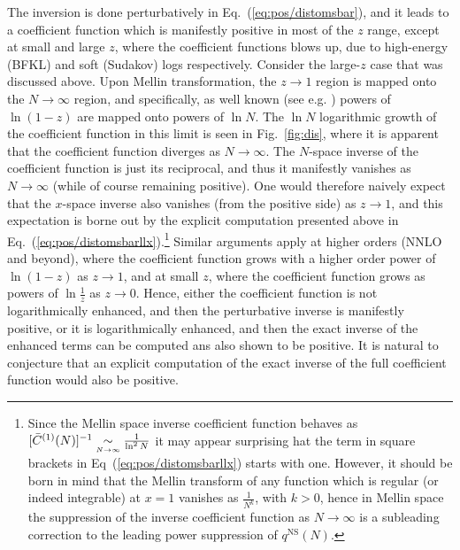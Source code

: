 The
inversion is done perturbatively in Eq.~(\ref{eq:pos/distomsbar}), and it
leads to a coefficient function which is manifestly positive in most
of the $z$ range, except at small and large $z$, where the coefficient
functions blows up, due to high-energy (BFKL) and soft (Sudakov) logs
respectively. Consider the large-$z$ case that was discussed
above. Upon 
Mellin transformation, the $z\to 1$ region is mapped onto the
$N\to\infty$ region, and specifically, as well known (see
e.g. \cite{Forte:2002ni}) powers of $\ln(1-z)$ are mapped onto
powers of $\ln N$.  
The $\ln N$ logarithmic growth of the coefficient function in this limit is
seen in Fig.~\ref{fig:dis}, where it is apparent that the coefficient function
diverges as $N\to\infty$. The $N$-space inverse of the coefficient function is
just its reciprocal, and thus it manifestly vanishes as $N\to\infty$ (while of
course remaining positive).
One would therefore naively expect that the $x$-space inverse also vanishes
(from the positive side) as $z\to1$, and this expectation is borne out by the
explicit computation presented above in
Eq.~(\ref{eq:pos/distomsbarllx}).\footnote{
  Since the Mellin space inverse coefficient function behaves as $[\bar
  C^{(1)}(N)]^{-1}\mathrel{\mathop{\sim}\limits_{\scriptscriptstyle {N\rightarrow\infty }}}\frac{1}{\ln^2 N}$ it may appear surprising hat the
  term in square brackets in Eq~(\ref{eq:pos/distomsbarllx}) starts with one.
  However, it should be born in mind that the Mellin transform of any function
  which is regular (or indeed integrable) at $x=1$ vanishes as $\frac{1}{N^k}$,
  with $k>0$, hence in Mellin space the suppression of the inverse coefficient
  function as $N\to\infty$ is a subleading correction to the leading power
  suppression of $q^{\textrm{NS}}(N)$.
}
Similar arguments apply at higher orders (NNLO and beyond), where the
coefficient function grows with a higher order power of $\ln(1-z)$ as $z\to1$,
and at small $z$, where the coefficient function grows as powers of $\ln
\frac{1}{z}$ as $z\to0$.
Hence, either the coefficient function is not logarithmically enhanced, and
then the perturbative inverse is manifestly positive, or it is logarithmically
enhanced, and then the exact inverse of the enhanced terms can be computed ans
also shown to be positive.
It is natural to conjecture that an explicit computation of the exact inverse
of the full coefficient function would also be positive.

